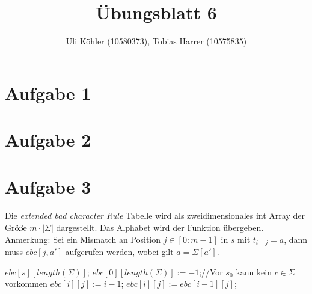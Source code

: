 \documentclass[a4paper,10pt,oneside,leqno]{scrartcl}
\title{Übungsblatt 6}
\author{Uli Köhler (10580373), Tobias Harrer (10575835)}
\begin{document}
\maketitle

\section*{Aufgabe 1}%

\section*{Aufgabe 2}%

\section*{Aufgabe 3}%
Die \textit{extended bad character Rule} Tabelle wird als zweidimensionales int Array der Größe $m\cdot |\Sigma|$ dargestellt. Das
Alphabet wird der Funktion übergeben. Anmerkung: Sei ein Mismatch an Position $j\in [0:m-1]$ in $s$ mit
$t_{i+j} = a$, dann muss $ebc[j,a']$ aufgerufen werden, wobei gilt $a=\Sigma[a']$.\newline
\begin{algorithmic}
\State $ebc[s][length(\Sigma)]$;
\State $ebc[0][length(\Sigma)] := -1$;//Vor $s_0$ kann kein $c\in \Sigma$ vorkommen
      \State $ebc[i][j] := i-1$;
    \Else
      \State $ebc[i][j] := ebc[i-1][j]$;
    \EndIf
  \EndFor
\EndFor
\EndFunction
\end{algorithmic}
\end{document}
